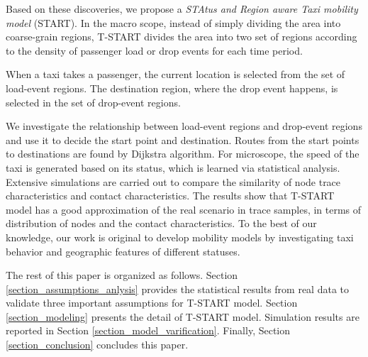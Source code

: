 Based on these discoveries, we propose a \emph{STAtus and Region aware Taxi mobility model} (START). In the macro scope, instead of simply dividing the area into coarse-grain regions, T-START divides the area into two set of regions according to the density of passenger load or drop events for each time period.


When a taxi takes a passenger, the current location is selected from the set of load-event regions. The destination region, where the drop event happens, is selected in the set of drop-event regions.



We investigate the relationship between load-event regions and drop-event regions and use it to decide the start point and destination. Routes from the start points to destinations are found by Dijkstra algorithm. For microscope, the speed of the taxi is generated based on its status, which is learned via statistical analysis. Extensive simulations are carried out to compare the similarity of node trace characteristics and contact characteristics. The results show that T-START model has a good approximation of the real scenario in trace samples, in terms of distribution of nodes and the contact characteristics. To the best of our knowledge, our work is original to develop mobility models by investigating taxi behavior and geographic features of different statuses.

The rest of this paper is organized as follows. Section \ref{section_assumptions_anlysis} provides the statistical results from real data to validate three important assumptions for T-START model. Section \ref{section_modeling} presents the detail of T-START model. Simulation results are reported in Section \ref{section_model_varification}. Finally, Section \ref{section_conclusion} concludes this paper.


